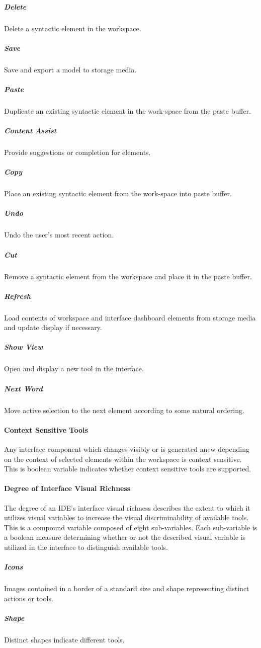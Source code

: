\subparagraph{Delete} Delete a syntactic element in the workspace.

\subparagraph{Save} Save and export a model to storage media.

\subparagraph{Paste} Duplicate an existing syntactic element in the
work{-}space from the paste buffer.

\subparagraph{Content Assist} Provide suggestions or completion for
elements.

\subparagraph{Copy} Place an existing syntactic element from the
work{-}space into paste buffer.

\subparagraph{Undo} Undo the user's most recent action.

\subparagraph{Cut} Remove a syntactic element from the workspace and place
it in the paste buffer.

\subparagraph{Refresh} Load contents of workspace and interface dashboard
elements from storage media and update display if necessary.

\subparagraph{Show View} Open and display a new tool in the interface.

\subparagraph{Next Word} Move active selection to the next element
according to some natural ordering.


\paragraph{Context Sensitive Tools} Any interface component which changes
visibly or is generated anew depending on the context of selected elements
within the workspace is context sensitive. This is boolean variable
indicates whether context sensitive tools are supported.


\paragraph{Degree of Interface Visual Richness} The degree of an IDE's
interface visual richness describes the extent to which it utilizes visual
variables to increase the visual discriminability of available tools. This
is a compound variable composed of eight sub-variables. Each sub-variable
is a boolean measure determining whether or not the described visual
variable is utilized in the interface to distinguish available tools.

\subparagraph{Icons} Images contained in a border of a standard size and
shape representing distinct actions or tools.
\cite{costagliola2002,moody2009}

\subparagraph{Shape} Distinct shapes indicate different tools.
\cite{moody2009}

